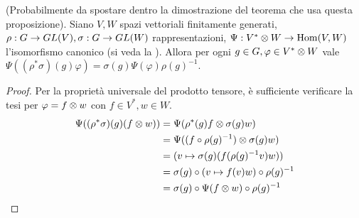 \begin{proposition}(Probabilmente da spostare dentro la dimostrazione del teorema che usa questa proposizione).
Siano $V\comma W$ spazi vettoriali finitamente generati, $\rho:G\to GL(V),\allowbreak\sigma:G\to GL(W)$ rappresentazioni, $\Psi:V^*\otimes W\to\operatorname{Hom}(V,W)$ l'isomorfismo canonico (si veda la ). Allora per ogni $g\in G,\allowbreak\varphi\in V^*\otimes W$ vale $\Psi((\rho^*\sigma)(g)\varphi)=\sigma(g)\Psi(\varphi)\rho(g)^{-1}$.
\end{proposition}
\begin{proof}
Per la proprietà universale del prodotto tensore, è sufficiente verificare la tesi per $\varphi=f\otimes w$ con $f\in V^*\comma w\in W$.
\begin{align*}
\Psi((\rho^*\sigma)(g)(f\otimes w))&=\Psi(\rho^*(g)f\otimes\sigma(g)w)\\
&=\Psi((f\circ\rho(g)^{-1})\otimes\sigma(g)w)\\
&=(v\mapsto \sigma(g)(f(\rho(g)^{-1}v)w))\\
&=\sigma(g)\circ(v\mapsto f(v)w)\circ\rho(g)^{-1}\\
&=\sigma(g)\circ\Psi(f\otimes w)\circ\rho(g)^{-1}
\end{align*}

\end{proof}



